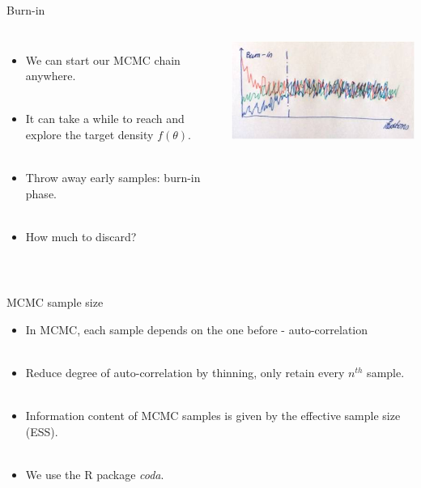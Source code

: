 \documentclass[compress]{beamer}
\begin{document}
\begin{frame}[label=sec-8-8]{Burn-in}
\begin{columns}[c] 
\begin{itemize}
\item We can start our MCMC chain anywhere. \\~\\
\item It can take a while to reach and explore the target density $f(\theta)$. \\~\\
\item Throw away early samples: \alert{burn-in} phase. \\~\\
\item How much to discard? \\~\\
\end{itemize}
\includegraphics[width=1\linewidth]{Burn}
\end{columns}
\end{frame} 

\begin{frame}[label=sec-8-9]{MCMC sample size}
\begin{itemize}
\item In MCMC, each sample depends on the one before - \alert{auto-correlation} \\~\\
\item Reduce degree of auto-correlation by \alert{thinning}, only retain every $n^{th}$ sample. \\~\\
\item Information content of MCMC samples is given by the \alert{effective sample size (ESS)}. \\~\\
\item We use the R package \textit{coda}.
\end{itemize}
\end{frame}
\end{document}
